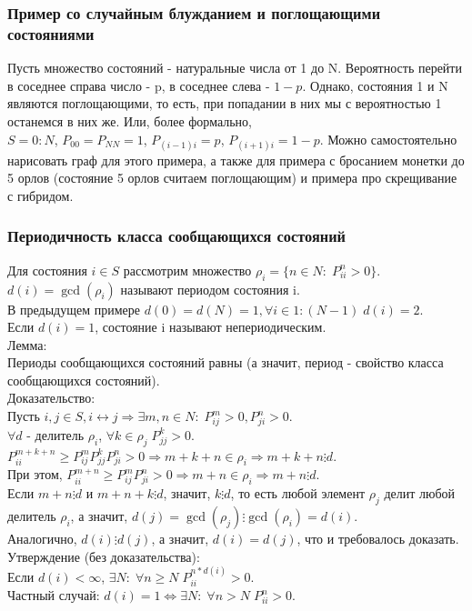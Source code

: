 \subsubsection{Пример со случайным блужданием и поглощающими состояниями}
Пусть множество состояний - натуральные числа от 1 до N. Вероятность перейти в соседнее справа число - p, в соседнее слева - $1 - p$. Однако, состояния 1 и N являются поглощающими, то есть, при попадании в них мы с вероятностью 1 останемся в них же. Или, более формально,\\
$S = 0:N$, $P_{00} = P_{NN} = 1$, $P_{(i - 1)i} = p$, $P_{(i + 1)i} = 1 - p$.
Можно самостоятельно нарисовать граф для этого примера, а также для примера с бросанием монетки до 5 орлов (состояние 5 орлов считаем поглощающим) и примера про скрещивание с гибридом.
\subsubsection{Периодичность класса сообщающихся состояний}
Для состояния $i \in S$ рассмотрим множество $\rho_i = \{n \in N: \; P^n_{ii} > 0\}$.\\
$d(i) = \gcd(\rho_i)$ называют периодом состояния i.\\
В предыдущем примере $d(0) = d(N) = 1, \forall i \in 1:(N - 1) \; d(i) = 2$.\\
Если $d(i) = 1$, состояние i называют непериодическим.\\
Лемма:\\
Периоды сообщающихся состояний равны (а значит, период - свойство класса сообщающихся состояний).\\
Доказательство:\\
Пусть $i, j \in S, i \leftrightarrow j \Rightarrow \exists m, n \in N: \; P^m_{ij} > 0, P^n_{ji} > 0$.\\
$\forall d$ - делитель $\rho_i$, $\forall k \in \rho_j \; P^k_{jj} > 0$.\\
$P^{m + k + n}_{ii} \geq P^m_{ij}P^k_{jj}P^n_{ji} > 0 \Rightarrow m + k + n \in \rho_i \Rightarrow m + k + n \vdots d$.\\
При этом, $P^{m + n}_{ii} \geq P^m_{ij}P^n_{ji} > 0 \Rightarrow m + n \in \rho_i \Rightarrow m + n \vdots d$.\\
Если $m + n \vdots d$ и $m + n + k \vdots d$, значит, $k \vdots d$, то есть любой элемент $\rho_j$ делит любой делитель $\rho_i$, а значит, $d(j) = \gcd(\rho_j) \vdots \gcd(\rho_i) = d(i)$.\\
Аналогично, $d(i) \vdots d(j)$, а значит, $d(i) = d(j)$, что и требовалось доказать.\\
Утверждение (без доказательства):\\
Если $d(i) < \infty$, $\exists N: \; \forall n \geq N \; P^{n * d(i)}_{ii} > 0$.\\
Частный случай: $d(i) = 1 \Leftrightarrow \exists N: \; \forall n > N \; P^n_{ii} > 0$.